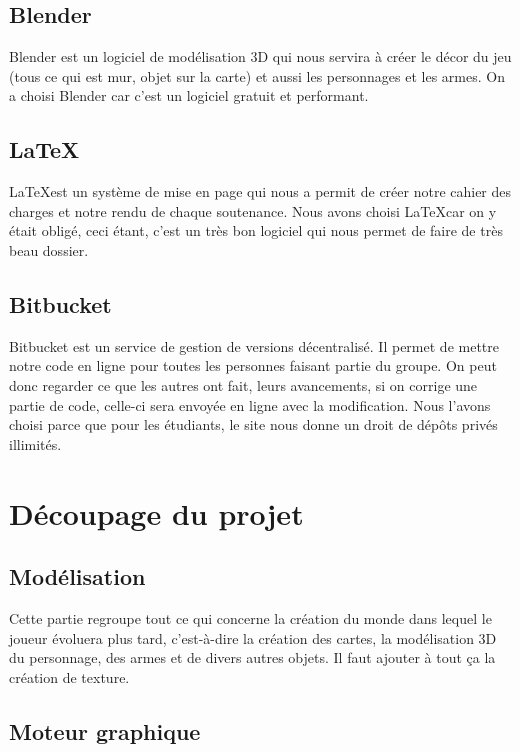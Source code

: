 \documentclass[a4paper, 11pt]{report}
\begin{document}
\subsection{Blender}\label{blender}

Blender est un logiciel de modélisation 3D qui nous servira à créer le décor du jeu (tous ce qui est mur, objet sur la carte) et aussi les personnages et les armes. On a choisi Blender car c'est un logiciel gratuit et performant.

\subsection{\LaTeX}\label{latex}

\LaTeX est un système de mise en page qui nous a permit de créer notre cahier des charges et notre rendu de chaque soutenance. Nous avons choisi \LaTeX car on y était obligé, ceci étant, c'est un très bon logiciel qui nous permet de faire de très beau dossier.

\subsection{Bitbucket}\label{bitbucket}

Bitbucket est un service de gestion de versions décentralisé. Il permet de mettre notre code en ligne pour toutes les personnes faisant partie du groupe. On peut donc regarder ce que les autres ont fait, leurs avancements, si on corrige une partie de code, celle-ci sera envoyée en ligne avec la modification. Nous l'avons choisi parce que pour les étudiants, le site nous donne un droit de dépôts privés illimités.

\newpage
\section{Découpage du projet}\label{duxe9coupage-du-projet}

\subsection{Modélisation}\label{moduxe9lisation}

Cette partie regroupe tout ce qui concerne la création du monde dans lequel le joueur évoluera plus tard, c'est-à-dire la création des cartes, la modélisation 3D du personnage, des armes et de divers autres objets. Il faut ajouter à tout ça la création de texture.

\subsection{Moteur graphique}\label{moteur-graphique}
\end{document}

